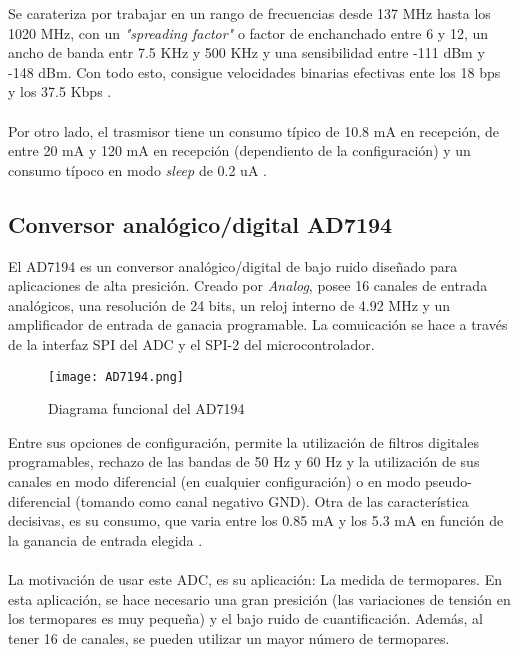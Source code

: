 	
	Se carateriza por trabajar en un rango de frecuencias desde 137 MHz hasta los 1020 MHz, con un \textit{"spreading factor"} o factor de enchanchado entre 6 y 12, un ancho de banda entr 7.5 KHz y 500 KHz y una sensibilidad entre -111 dBm y -148 dBm. Con todo esto, consigue velocidades binarias efectivas ente los 18 bps y los 37.5 Kbps \citep{SX1276}.
	\paragraph{}
	Por otro lado, el trasmisor tiene un consumo típico de 10.8 mA en recepción, de entre 20 mA  y 120 mA en recepción (dependiento de la configuración) y un consumo típoco en modo \textit{sleep} de 0.2 uA \citep{SX1276}.
	
	
	\subsection{Conversor analógico/digital AD7194} \label{AD7194}
	
	El AD7194 es un conversor analógico/digital de bajo ruido diseñado para aplicaciones de alta presición. Creado por \textit{Analog}, posee 16 canales de entrada analógicos, una resolución de 24 bits, un reloj interno de 4.92 MHz y un amplificador de entrada de ganacia programable. La comuicación se hace a través de la interfaz SPI del ADC y el SPI-2 del microcontrolador.
	
	\begin{figure}[htb!]
		\centering
		\texttt{[image: AD7194.png]}
		\caption{Diagrama funcional del AD7194 \citep{AD7194}}
	\end{figure}
	
	Entre sus opciones de configuración, permite la utilización de filtros digitales programables, rechazo de las bandas de 50 Hz y 60 Hz y la utilización de sus canales en modo diferencial (en cualquier configuración) o en modo pseudo-diferencial (tomando como canal negativo GND). Otra de las característica decisivas, es su consumo,  que varia entre los 0.85 mA y los 5.3 mA en función de la ganancia de entrada elegida \citep{AD7194}.
	
	\paragraph{}
	La motivación de usar este ADC, es su aplicación: La medida de termopares. En esta aplicación, se hace necesario una gran presición (las variaciones de tensión en los termopares es muy pequeña) y el bajo ruido de cuantificación. Además, al tener 16 de canales, se pueden utilizar un mayor número de termopares.
	
